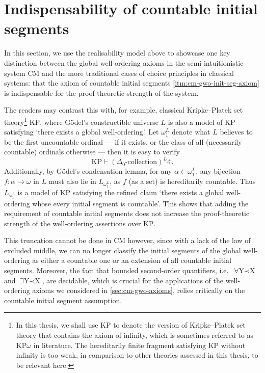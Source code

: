\documentclass[12pt,openany]{book}
\theoremstyle{plain}
\theoremstyle{definition}
\newcommand\opA[1]{\mathop{\forall #1}}
\newcommand\opE[1]{\mathop{\exists #1}}
\newcommand\KP{\mathrm{KP}}
\newcommand\CM{\mathrm{CM}}
\begin{document}
\section{Indispensability of countable initial segments}

In this section, we use the realisability model above to showcase one key distinction between the global well-ordering axioms in the semi-intuitionistic system $\CM$ and the more traditional cases of choice principles in classical systems: that the axiom of countable initial segments \ref{itm:cm-gwo-init-seg-axiom} is indispensable for the proof-theoretic strength of the system.

The readers may contrast this with, for example, classical Kripke--Platek set theory\footnote{In this thesis, we shall use $\KP$ to denote the version of Kripke--Platek set theory that contains the axiom of infinity, which is sometimes referred to as $\KP\omega$ in literature. The hereditarily finite fragment satisfying $\KP$ without infinity is too weak, in comparison to other theories assessed in this thesis, to be relevant here.} $\KP$, where G\"odel's constructible universe $L$ is also a model of $\KP$ satisfying `there exists a global well-ordering'. Let $\omega_1^L$ denote what $L$ believes to be the first uncountable ordinal --- if it exists, or the class of all (necessarily countable) ordinals otherwise --- then it is easy to verify
\[\KP \vdash \left(\Delta_0\text{-collection}\right)^{L_{\omega_1^L}}.\]
Additionally, by G\"odel's condensation lemma, for any $\alpha \in \omega_1^L$, any bijection $f : \alpha \rightarrow \omega$ in $L$ must also lie in $L_{\omega_1^L}$, as $f$ (as a set) is hereditarily countable. Thus $L_{\omega_1^L}$ is a model of $\KP$ satisfying the refined claim `there exists a global well-ordering whose every initial segment is countable'. This shows that adding the requirement of countable initial segments does not increase the proof-theoretic strength of the well-ordering assertions over $\KP$.

This truncation cannot be done in $\CM$ however, since with a lack of the law of excluded middle, we can no longer classify the initial segments of the global well-ordering as either a countable one or an extension of all countable initial segments. Moreover, the fact that bounded second-order quantifiers, i.e.\ $\opA{Y \prec X}$ and $\opE{Y \prec X}$, are decidable, which is crucial for the applications of the well-ordering axioms we considered in \autoref{sec:cm-gwo-axioms}, relies critically on the countable initial segment assumption.
\end{document}
